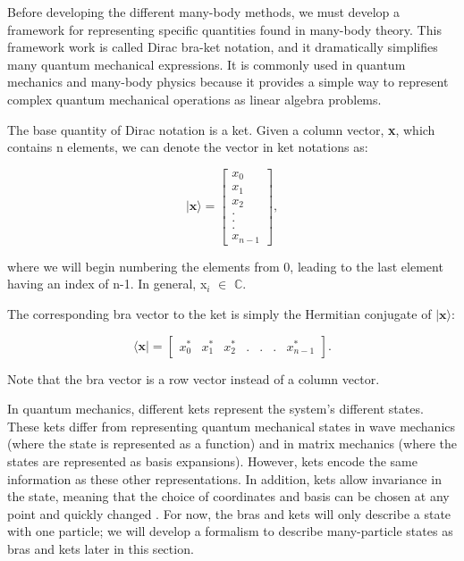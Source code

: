 Before developing the different many-body methods, we must develop a  framework for representing specific quantities found in many-body theory. This framework work is called Dirac bra-ket notation, and it dramatically simplifies many quantum mechanical expressions. It is commonly used in quantum mechanics and many-body physics because it provides a simple way to represent complex quantum mechanical operations as linear algebra problems.

The base quantity of Dirac notation is a ket. Given a column vector, \textbf{x}, which contains n elements, we can denote the vector in ket notations as:

\begin{equation}
    | \textbf{x} \rangle = \begin{bmatrix}
                                x_0 \\
                                x_1 \\
                                x_2 \\
                                . \\
                                . \\
                                . \\
                                x_{n-1}
                        \end{bmatrix},
\end{equation}

where we will begin numbering the elements from 0, leading to the last element having an index of n-1. In general, x$_i$ $\in$ $\mathbb{C}$.

The corresponding bra vector to the ket is simply the Hermitian conjugate of $| \textbf{x} \rangle$:

\begin{equation}
    \langle \textbf{x} | = \begin{bmatrix}
        x_0^* & x_1^* & x_2^* & . & . & . & x_{n-1}^* \end{bmatrix}.
\end{equation}

Note that the bra vector is a row vector instead of a column vector.

In quantum mechanics, different kets represent the system's different states. These kets differ from representing quantum mechanical states in wave mechanics (where the state is represented as a function) and in matrix mechanics (where the states are represented as basis expansions). However, kets encode the same information as these other representations. In addition, kets allow invariance in the state, meaning that the choice of coordinates and basis can be chosen at any point and quickly changed \cite{Ref5}. For now, the bras and kets will only describe a state with one particle; we will develop a formalism to describe many-particle states as bras and kets later in this section.

